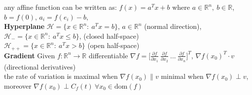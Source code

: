\documentclass[a4paper]{article}
\begin{document}
\textsf{any affine function can be written as: } $f(x)=a^T{x}+b$ where $a\in\mathbb{R}^n, \ b \in \mathbb{R}$, $b=f(0)$, $a_i = f(e_i)-b$, \\
\textbf{Hyperplane} $\mathcal{H}=\{x\in\mathbb{R}^n: \ a^T x = b\}$, $a\in \mathbb{R}^n$ (normal direction), 
$\mathcal{H}_{-} = \{x\in\mathbb{R}^n: \ a^T x \le b \}$, (closed half-space) \\
$\mathcal{H}_{++}=\{x\in\mathbb{R}^n: \ a^T x > b\}$ (open half-space)\\
\textbf{Gradient} Given $f:\mathbb{R}^n\to\mathbb{R}$ differentiable $\nabla{f}=\bigg[
    \frac{\partial f}{\partial x_1} \ \frac{\partial f}{\partial x_2}\ ... \ \frac{\partial f}{\partial x_n}
\bigg]^T$, $\nabla{f}(x_0)^T \cdot v $ (directional derivatives)\\
\textsf{the rate of variation is maximal} when $\nabla{f}(x_0)  \parallel v $ \textsf{minimal when} $\nabla{f}(x_0) \perp v$, moreover $\nabla{f}(x_0)\perp C_f(t) \ \forall x_0 \in \text{dom}(f)$
\end{document}
